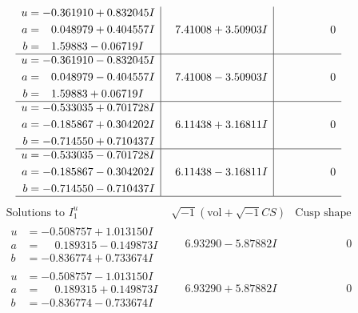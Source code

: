 \documentclass[1p]{elsarticle_modified}
\theoremstyle{definition}
\newcommand{\I}{\sqrt{-1}}
\begin{document}
$$\begin{array}{c|c|c}
\begin{aligned}
u &= -0.361910 + 0.832045 I \\
a &= \phantom{-}0.048979 + 0.404557 I \\
b &= \phantom{-}1.59883 - 0.06719 I\end{aligned}
 & \phantom{-}7.41008 + 3.50903 I & \phantom{-0.000000 } 0 \\ \hline\begin{aligned}
u &= -0.361910 - 0.832045 I \\
a &= \phantom{-}0.048979 - 0.404557 I \\
b &= \phantom{-}1.59883 + 0.06719 I\end{aligned}
 & \phantom{-}7.41008 - 3.50903 I & \phantom{-0.000000 } 0 \\ \hline\begin{aligned}
u &= -0.533035 + 0.701728 I \\
a &= -0.185867 + 0.304202 I \\
b &= -0.714550 + 0.710437 I\end{aligned}
 & \phantom{-}6.11438 + 3.16811 I & \phantom{-0.000000 } 0 \\ \hline\begin{aligned}
u &= -0.533035 - 0.701728 I \\
a &= -0.185867 - 0.304202 I \\
b &= -0.714550 - 0.710437 I\end{aligned}
 & \phantom{-}6.11438 - 3.16811 I & \phantom{-0.000000 } 0\\
 \hline 
 \end{array}$$\newpage$$\begin{array}{c|c|c}  
\text{Solutions to }I^u_{1}& \I (\text{vol} + \sqrt{-1}CS) & \text{Cusp shape}\\
 \hline 
\begin{aligned}
u &= -0.508757 + 1.013150 I \\
a &= \phantom{-}0.189315 - 0.149873 I \\
b &= -0.836774 + 0.733674 I\end{aligned}
 & \phantom{-}6.93290 - 5.87882 I & \phantom{-0.000000 } 0 \\ \hline\begin{aligned}
u &= -0.508757 - 1.013150 I \\
a &= \phantom{-}0.189315 + 0.149873 I \\
b &= -0.836774 - 0.733674 I\end{aligned}
 & \phantom{-}6.93290 + 5.87882 I & \phantom{-0.000000 } 0 \\ \hline\begin{aligned}

\end{aligned}
\end{array}$$
\end{document}
